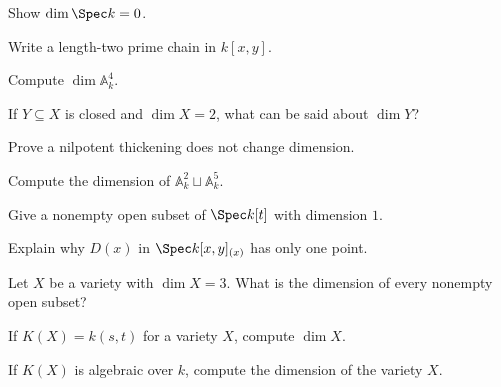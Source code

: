 \begin{exercise}[VI.30.E1]\label{exer:vi30-01}
Show $\dim\Spec k=0$.
\end{exercise}

\begin{exercise}[VI.30.E2]\label{exer:vi30-02}
Write a length-two prime chain in $k[x,y]$.
\end{exercise}

\begin{exercise}[VI.30.E3]\label{exer:vi30-03}
Compute $\dim\mathbb A^4_k$.
\end{exercise}

\begin{exercise}[VI.30.E4]\label{exer:vi30-04}
If $Y\subseteq X$ is closed and $\dim X=2$, what can be said about $\dim Y$?
\end{exercise}

\begin{exercise}[VI.30.E5]\label{exer:vi30-05}
Prove a nilpotent thickening does not change dimension.
\end{exercise}

\begin{exercise}[VI.30.E6]\label{exer:vi30-06}
Compute the dimension of $\mathbb A^2_k\sqcup\mathbb A^5_k$.
\end{exercise}

\begin{exercise}[VI.30.E7]\label{exer:vi30-07}
Give a nonempty open subset of $\Spec k[t]$ with dimension $1$.
\end{exercise}

\begin{exercise}[VI.30.E8]\label{exer:vi30-08}
Explain why $D(x)$ in $\Spec k[x,y]_{(x)}$ has only one point.
\end{exercise}

\begin{exercise}[VI.30.E9]\label{exer:vi30-09}
Let $X$ be a variety with $\dim X=3$. What is the dimension of every nonempty open subset?
\end{exercise}

\begin{exercise}[VI.30.E10]\label{exer:vi30-10}
If $K(X)=k(s,t)$ for a variety $X$, compute $\dim X$.
\end{exercise}

\begin{exercise}[VI.30.E11]\label{exer:vi30-11}
If $K(X)$ is algebraic over $k$, compute the dimension of the variety $X$.
\end{exercise}

